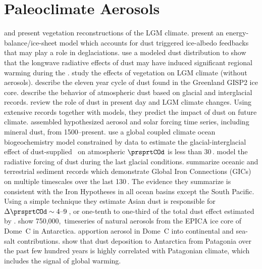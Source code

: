 \documentclass[12pt,twoside]{book}
\begin{document}

\chapter[Paleoclimate Aerosols]{Paleoclimate Aerosols}\label{sxn:pcl}

\cite{AdF95} and \cite{Cro95} present vegetation reconstructions of
the LGM climate.
\cite{PeM95} present an energy-balance/ice-sheet model which accounts
for dust triggered ice-albedo feedbacks that may play a role in
deglaciations. 
\cite{ORL96} use a modeled dust distribution to show that 
the longwave radiative effects of dust may have induced significant
regional warming during the .
\cite{CrB97} study the effects of vegetation on LGM climate (without
aerosols). 
\cite{RSK97} describe the eleven year cycle of dust found in the
Greenland GISP2 ice core.
\cite{AAG98} describe the behavior of atmospheric dust based on
glacial and interglacial records.
\cite{HKR01} review the role of dust in present day and LGM climate
changes. 
Using extensive records \cite[][]{KoH01} together with models, they
predict the impact of dust on future climate.
\cite{ROR01} assembled hypothesized aerosol and solar forcing time
series, including mineral dust, from 1500--present.
\cite{AWL00} 
\cite{BKQ03} use a global coupled climate ocean biogeochemistry model
constrained by  data to estimate the
glacial-interglacial effect of dust-supplied \Fe\ on atmospheric  
$\prsprtCOd$ is less than 30\,\ppm.
\cite{CRK03} model the radiative forcing of dust during the last
glacial conditions.
\cite{ACA05} summarize oceanic and terrestrial sediment records which 
demonstrate Global Iron Connections (GICs) on multiple timescales over
the last 130\,\kya.
The evidence they summarize is consistent with the Iron Hypotheses
in all ocean basins except the South Pacific.
Using a simple technique they estimate Asian dust is responsible for
$\Delta\prsprtCOd \sim 4\mbox{--}9$\,\ppm, or one-tenth to
one-third of the total dust effect estimated by \cite{BKQ03}.
\cite{WFF06} show 750,000\m,\yr\ timeseries of natural aerosols from
the EPICA ice core of Dome~C in Antarctica.
\cite{BRL06} apportion aerosol in Dome~C into continental and sea-salt
contributions. 
\cite{MAB07} show that dust deposition to Antarctica from Patagonia
over the past few hundred years is highly correlated with Patagonian
climate, which includes the signal of global warming.
\end{document}
